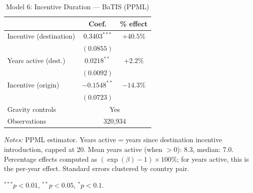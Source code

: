 \begin{table}[htbp]
\centering
\caption{Model 6: Incentive Duration --- BaTIS (PPML)}
\label{tab:batis_model6}
\small
\begin{tabular}{l cc}
\toprule
 & Coef. & \% effect \\
\midrule
Incentive (destination) & $0.3403^{***}$ & $+40.5\%$ \\
 & $(0.0855)$ & \\[4pt]
Years active (dest.) & $0.0218^{**}$ & $+2.2\%$ \\
 & $(0.0092)$ & \\[4pt]
Incentive (origin) & $-0.1548^{**}$ & $-14.3\%$ \\
 & $(0.0723)$ & \\[4pt]
\midrule
Gravity controls & \multicolumn{2}{c}{Yes} \\
Observations & \multicolumn{2}{c}{320,934} \\
\bottomrule
\end{tabular}
\par\vspace{4pt}\noindent\begin{minipage}{\textwidth}
\footnotesize
\par \textit{Notes:} PPML estimator. Years active = years since destination incentive introduction, capped at 20. Mean years active (when $>$0): 8.3, median: 7.0. Percentage effects computed as $(\exp(\beta)-1) \times 100\%$; for years active, this is the per-year effect. Standard errors clustered by country pair.
\par $^{***}p<0.01$, $^{**}p<0.05$, $^{*}p<0.1$.
\end{minipage}
\end{table}

\clearpage


